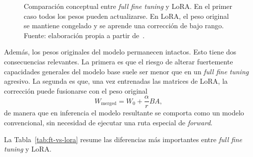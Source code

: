 \begin{figure}[H]
\centering
\setlength{\fboxsep}{8pt}
%
\caption{Comparación conceptual entre \textit{full fine tuning} y LoRA. En el primer caso todos los pesos pueden actualizarse. En LoRA, el peso original se mantiene congelado y se aprende una corrección de bajo rango. Fuente: elaboración propia a partir de~\cite{hu2021lora}.}
\label{fig:lora-correccion}
\end{figure}

Además, los pesos originales del modelo permanecen intactos. Esto tiene dos consecuencias relevantes. La primera es que el riesgo de alterar fuertemente capacidades generales del modelo base suele ser menor que en un \textit{full fine tuning} agresivo. La segunda es que, una vez entrenadas las matrices de LoRA, la corrección puede fusionarse con el peso original
\[
W_{\mathrm{merged}} = W_0 + \frac{\alpha}{r}BA,
\]
de manera que en inferencia el modelo resultante se comporta como un modelo convencional, sin necesidad de ejecutar una ruta especial de \textit{forward}.

La Tabla~\ref{tab:ft-vs-lora} resume las diferencias más importantes entre \textit{full fine tuning} y LoRA.

